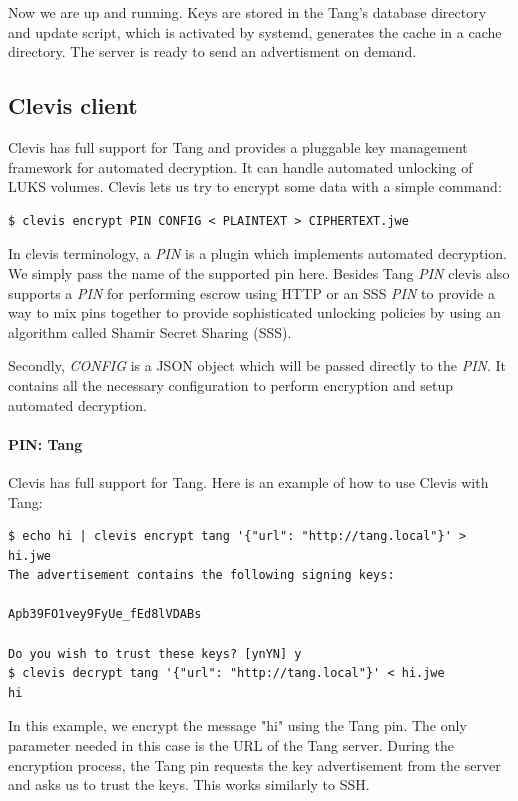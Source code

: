 Now we are up and running.
Keys are stored in the Tang's database directory and update script, which is activated by systemd, generates the cache in a cache directory. %
The server is ready to send an advertisment on demand.



\subsection{Clevis client}\label{clevis}

Clevis has full support for Tang and provides a pluggable key management framework for automated decryption.
It can handle automated unlocking of LUKS volumes.
Clevis lets us try to encrypt some data with a simple command:
\begin{lstlisting}[columns=fixed,basicstyle=\ttfamily\footnotesize,tabsize=4,backgroundcolor=\color{yellow!10}]
$ clevis encrypt PIN CONFIG < PLAINTEXT > CIPHERTEXT.jwe
\end{lstlisting}
In clevis terminology, a {\it PIN} is a plugin which implements automated decryption.
We simply pass the name of the supported pin here.
Besides Tang {\it PIN} clevis also supports a {\it PIN} for performing escrow using HTTP or an SSS {\it PIN} to provide a way to mix pins together to provide sophisticated unlocking policies by using an algorithm called Shamir Secret Sharing (SSS).%

Secondly, {\it CONFIG} is a JSON object which will be passed directly to the {\it PIN}. %
It contains all the necessary configuration to perform encryption and setup automated decryption.


\paragraph{PIN: Tang}
Clevis has full support for Tang.
Here is an example of how to use Clevis with Tang:
\begin{lstlisting}[columns=fixed,basicstyle=\ttfamily\footnotesize,tabsize=4,backgroundcolor=\color{yellow!10}]
$ echo hi | clevis encrypt tang '{"url": "http://tang.local"}' > hi.jwe
The advertisement contains the following signing keys:

Apb39FO1vey9FyUe_fEd8lVDABs

Do you wish to trust these keys? [ynYN] y
$ clevis decrypt tang '{"url": "http://tang.local"}' < hi.jwe
hi
\end{lstlisting}
In this example, we encrypt the message "hi" using the Tang pin.
The only parameter needed in this case is the URL of the Tang server.
During the encryption process, the Tang pin requests the key advertisement from the server and asks us to trust the keys.
This works similarly to SSH.

